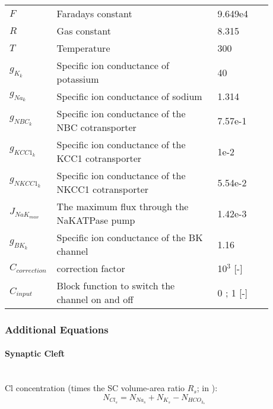\begin{table}[h!]
\centering
\begin{tabular}{| p{0.09\linewidth} | >{\footnotesize} p{0.6\linewidth} | >{\footnotesize} p{0.17\linewidth} | >{\footnotesize} p{0.02\linewidth} |}
\arrayrulecolor{lightgrey}\hline	
$F$ 			& Faradays constant														& 9.649e4 \Cmol 	& \\
$R$ 			& Gas constant 															& 8.315 \JmolK		& \\
$T$ 	    	& Temperature 															& 300 \Kelvin		& \\
$g_{K_{k}}$ 	& Specific ion conductance of potassium 								& 40 \perOhmm 		& \cite{Ostby2009}  \\
$g_{Na_k}$ 		& Specific ion conductance of sodium 									& 1.314  \perOhmm 	& \cite{Ostby2009}  \\
$g_{NBC_k}$ 	& Specific ion conductance of the NBC cotransporter						& 7.57e-1 \perOhmm 	& \cite{Ostby2009}  \\
$g_{KCC1_k}$ 	& Specific ion conductance of the KCC1 cotransporter					& 1e-2 \perOhmm 	& \cite{Ostby2009}  \\
$g_{NKCC1_k}$ 	& Specific ion conductance of the NKCC1 cotransporter	 				& 5.54e-2 \perOhmm 	& \cite{Ostby2009}  \\
$J_{NaK_{max}}$ & The maximum flux through the NaKATPase pump							& 1.42e-3 \uMms 	& \cite{Ostby2009}  \\
$g_{BK_k}$ 		& Specific ion conductance of the BK channel							& 1.16     \perOhmm & \cite{LoesEvert}  \\
$C_{correction}$  & correction factor & 10$^3$ [-] & \cite{LoesEvert} \\
$C_{input}$  & Block function to switch the channel on and off &  0 ; 1 [-] & \cite{LoesEvert} \\
\hline
\end{tabular}
\end{table}



\newpage
\subsubsection{Additional Equations}
\paragraph{Synaptic Cleft}~\\
%
\gls{Cl} concentration  (times the SC volume-area ratio $R_s$; in \uMm): 
\begin{equation} \label{eq:ClEx}
N_{Cl_s}= N_{Na_s}+N_{K_s}-N_{ HCO_{3_s}}
\end{equation}

